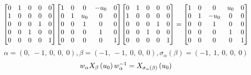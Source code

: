 \documentclass[11pt]{article}
\theoremstyle{definition}
\begin{document}
\[
\scaletoalign{\textwidth}{{\left[\begin{matrix}0 & 1 & 0 & 0 & 0\\1 & 0 & 0 & 0 & 0\\0 & 0 & 0 & 1 & 0\\0 & 0 & 1 & 0 & 0\\0 & 0 & 0 & 0 & 1\end{matrix}\right]} {\left[\begin{matrix}1 & 0 & 0 & - u_{0} & 0\\0 & 1 & u_{0} & 0 & 0\\0 & 0 & 1 & 0 & 0\\0 & 0 & 0 & 1 & 0\\0 & 0 & 0 & 0 & 1\end{matrix}\right]} {\left[\begin{matrix}0 & 1 & 0 & 0 & 0\\1 & 0 & 0 & 0 & 0\\0 & 0 & 0 & 1 & 0\\0 & 0 & 1 & 0 & 0\\0 & 0 & 0 & 0 & 1\end{matrix}\right]} = {\left[\begin{matrix}1 & 0 & 0 & u_{0} & 0\\0 & 1 & - u_{0} & 0 & 0\\0 & 0 & 1 & 0 & 0\\0 & 0 & 0 & 1 & 0\\0 & 0 & 0 & 0 & 1\end{matrix}\right]}}
\]
\[
\alpha = \left( 0, \  -1, \  0, \  0, \  0\right), \beta = \left( -1, \  -1, \  0, \  0, \  0\right), \sigma_{\alpha}(\beta) = \left( -1, \  1, \  0, \  0, \  0\right)
\]
\[
\scaletoalign{\textwidth}{w_{\alpha} X_{\beta}\left(u_{0}\right) w_{\alpha}^{-1} = X_{\sigma_{\alpha}\left(\beta\right)}\left(u_{0}\right)}
\]
\end{document}
